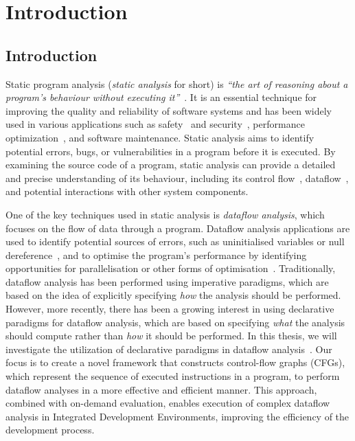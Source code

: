\chapter{Introduction}
\section{Introduction}

Static program analysis (\emph{static analysis} for short) is
\emph{``the art of reasoning about a program's behaviour without executing it''}~\cite{spa}.
It is an essential technique for improving the quality and reliability of software
systems and has been widely used in various applications such
as safety~\cite{cousot2005astree,Blanchet2002} and security~\cite{piskachev2021secucheck,flowDroid,ayewah2008using,Sayar_2022,fink2012wala},
performance optimization~\cite{aho2007compilers,appel2004modern}, and software maintenance.
Static analysis aims to identify potential errors, bugs, or vulnerabilities
in a program before it is executed.
By examining the source code of a program, static
analysis can provide a detailed and precise understanding of its behaviour, including
its control flow~\cite{allen1970control}, dataflow~\cite{kam1977monotone},
and potential interactions with other system components.



One of the key techniques used in static analysis is \emph{dataflow analysis},
which focuses on the flow of data through a program. Dataflow analysis applications are used to identify
potential sources of errors, such as uninitialised variables or null dereference~\cite{riouak2021precise,10.1016/j.scico.2012.02.002},
and to optimise the program's performance by identifying opportunities for
parallelisation or other forms of optimisation~\cite{aho2007compilers}.
Traditionally, dataflow analysis has been performed using imperative paradigms,
which are based on the idea of explicitly specifying \emph{how} the analysis should be
performed.
However, more recently, there has been a growing interest in using
declarative paradigms for dataflow analysis, which are based on specifying \emph{what}
the analysis should compute rather than \emph{how} it should be performed.
In this thesis, we will investigate the utilization of declarative paradigms in
dataflow analysis~\cite{smits2020flowspec,madsen2016programming}. Our focus is to
create a novel framework that constructs control-flow graphs (CFGs), which represent the
sequence of executed instructions in a program, to perform dataflow analyses in a
more effective and efficient manner. This approach, combined with on-demand evaluation,
enables execution of complex dataflow analysis in Integrated Development Environments,
improving the efficiency of the development process.

